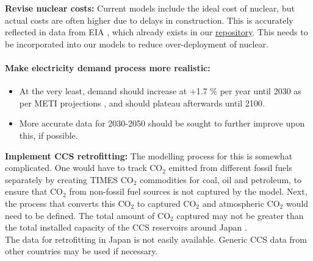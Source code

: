 \documentclass[14pt,a4paper]{article} %
\begin{document}
\textbf{Revise nuclear costs:} Current models include the ideal cost of nuclear, but actual costs are often higher due to delays in construction. This is accurately reflected in data from \gls{EIA} \cite{noauthor_eia_2019}, which already exists in our \href{https://github.com/arfc/i2cner/tree/master/data/japan_costs/fossil-ccs-nuc.xlsx}{repository}. This needs to be incorporated into our models to reduce over-deployment of nuclear.\\

\paragraph{Make electricity demand process more realistic:}

\begin{itemize}
\item At the very least, demand should increase at +1.7 \% per year until 2030 as per \gls{METI} projections \cite{noauthor_electricity_2017}, and should plateau afterwards until 2100.

\item More accurate data for 2030-2050 should be sought to further improve upon this, if possible.

\end{itemize}

\textbf{Implement \gls{CCS} retrofitting:} The modelling process for this is somewhat complicated. One would have to track CO$_2$ emitted from different fossil fuels separately by creating \gls{TIMES}  CO$_2$ commodities for coal, oil and petroleum, to ensure that CO$_2$ from non-fossil fuel sources is not captured by the model. Next, the process that converts this CO$_2$ to captured CO$_2$ and atmospheric CO$_2$ would need to be defined. The total amount of CO$_2$ captured may not be greater than the total installed capacity of the \gls{CCS} reservoirs around Japan \cite{kato_energy_2016}.\\
The data for retrofitting in Japan is not easily available. Generic \gls{CCS} data from other countries may be used if necessary.\\


%


%

\end{document}
